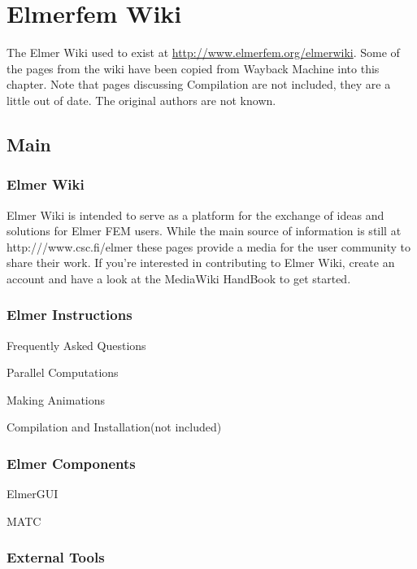 
\chapter{Elmerfem Wiki}

The Elmer Wiki used to exist at \url{http://www.elmerfem.org/elmerwiki}.  Some of the pages from the wiki have been copied from Wayback Machine into this chapter. Note that pages discussing Compilation are not included, they are a little out of date.  The original authors are not known.

\section{Main}

\subsection{Elmer Wiki}

Elmer Wiki is intended to serve as a platform for the exchange of ideas and solutions for Elmer FEM users. While the main source of information is still at http:///www.csc.fi/elmer these pages provide a media for the user community to share their work. If you're interested in contributing to Elmer Wiki, create an account and have a look at the MediaWiki HandBook to get started.

\subsection{Elmer Instructions}

\noindent Frequently Asked Questions

\noindent Parallel Computations

\noindent Making Animations

\noindent Compilation and Installation(not included)

\subsection{Elmer Components}

\noindent ElmerGUI

\noindent MATC

\subsection{External Tools}

